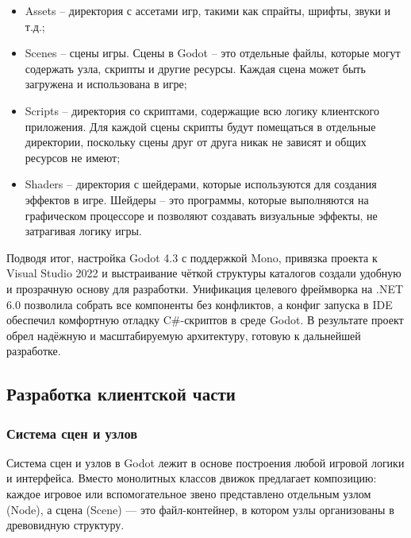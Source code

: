         \begin{itemize}
            \item Assets -- директория с ассетами игр, такими как спрайты, шрифты, звуки и т.д.;

            \item Scenes -- сцены игры. Сцены в Godot -- это отдельные файлы, которые могут содержать узла, скрипты и другие ресурсы. Каждая сцена может быть загружена и использована в игре;
        
            \item Scripts -- директория со скриптами, содержащие всю логику клиентского приложения. Для каждой сцены скрипты будут помещаться в отдельные директории, поскольку сцены друг от друга никак
            не зависят и общих ресурсов не имеют;
        
            \item Shaders -- директория с шейдерами, которые используются для создания эффектов в игре. Шейдеры -- это программы, которые выполняются на графическом процессоре и позволяют создавать визуальные эффекты,
            не затрагивая логику игры.
        \end{itemize}

        Подводя итог, настройка Godot 4.3 с поддержкой Mono, привязка проекта к Visual Studio 2022 и выстраивание чёткой структуры каталогов 
        создали удобную и прозрачную основу для разработки. 
        Унификация целевого фреймворка на .NET 6.0 позволила собрать все компоненты без конфликтов, а конфиг запуска в IDE обеспечил комфортную отладку C\#-скриптов в среде Godot. 
        В результате проект обрел надёжную и масштабируемую архитектуру, готовую к дальнейшей разработке.


    \subsection{Разработка клиентской части}

        \subsubsection{Система сцен и узлов}
        
        Система сцен и узлов в Godot лежит в основе построения любой игровой логики и интерфейса. Вместо монолитных классов движок предлагает композицию: каждое игровое или вспомогательное 
        звено представлено отдельным узлом (Node), а сцена (Scene) — это файл-контейнер, в котором узлы организованы в древовидную структуру.

